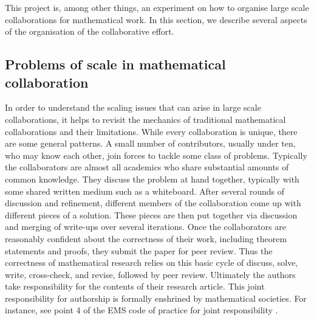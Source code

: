 \documentclass[12pt]{amsart}
\theoremstyle{definition}
\begin{document}
This project is, among other things, an experiment on how to organise large scale collaborations for mathematical work. In this section, we describe several aspects of the organisation of the collaborative effort.

\subsection{Problems of scale in mathematical collaboration}
In order to understand the scaling issues that can arise in large scale collaborations, it helps to revisit the mechanics of traditional mathematical collaborations and their limitations. While every collaboration is unique, there are some general patterns. A small number of contributors, usually under ten, who may know each other, join forces to tackle some class of problems. Typically the collaborators are almost all academics who share substantial amounts of common knowledge. They discuss the problem at hand together, typically with some shared written medium such as a whiteboard. After several rounds of discussion and refinement, different members of the collaboration come up with different pieces of a solution. These pieces are then put together via discussion and merging of write-ups over several iterations. Once the collaborators are reasonably confident about the correctness of their work, including theorem statements and proofs, they submit the paper for peer review. Thus the correctness of mathematical research relies on this basic cycle of discuss, solve, write, cross-check, and revise, followed by peer review. Ultimately the authors take responsibility for the contents of their research article. This joint responsibility for authorship is formally enshrined by mathematical societies. For instance, see point 4 of the EMS code of practice for joint responsibility \cite{EMS_code_of_practice}.
\end{document}
